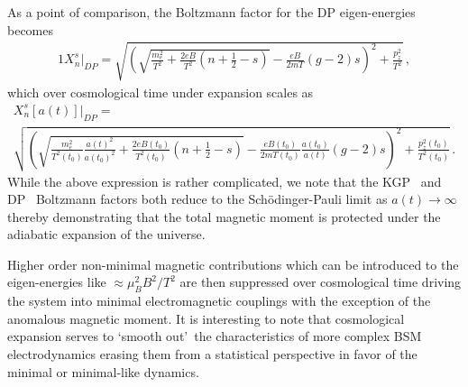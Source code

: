 As a point of comparison, the Boltzmann factor for the DP eigen-energies becomes
\begin{alignat}{1}
    \label{XDP} X_{n}^{s}\vert_{DP} = \sqrt{\left(\sqrt{\frac{m_{e}^{2}}{T^{2}}+\frac{2eB}{T^{2}}\left(n+\frac{1}{2}-s\right)}-\frac{eB}{2mT}(g-2)s\right)^{2}+\frac{p_{z}^{2}}{T^{2}}}\,,
\end{alignat}
which over cosmological time under expansion scales as
\begin{multline}
    \label{XScaleDP} X_{n}^{s}[a(t)]\vert_{DP} =\\ \sqrt{\left(\sqrt{\frac{m_{e}^{2}}{T^{2}(t_{0})}\frac{a(t)^{2}}{a(t_{0})^{2}}+\frac{2eB(t_{0})}{T^{2}(t_{0})}\left(n+\frac{1}{2}-s\right)}-\frac{eB(t_{0})}{2mT(t_{0})}\frac{a(t_{0})}{a(t)}(g-2)s\right)^{2}+\frac{p_{z}^{2}(t_{0})}{T^{2}(t_{0})}}\,.
\end{multline}
While the above expression is rather complicated, we note that the KGP~ and DP~ Boltzmann factors both reduce to the Sch{\"o}dinger-Pauli limit as $a(t)\rightarrow\infty$ thereby demonstrating that the total magnetic moment is protected under the adiabatic expansion of the universe.

Higher order non-minimal magnetic contributions which can be introduced to the eigen-energies like $\approx\mu_{B}^{2}B^{2}/T^{2}$ are then suppressed over cosmological time driving the system into minimal electromagnetic couplings with the exception of the anomalous magnetic moment. It is interesting to note that cosmological expansion serves to \lq smooth out\rq\ the characteristics of more complex BSM electrodynamics erasing them from a statistical perspective in favor of the minimal or minimal-like dynamics.

